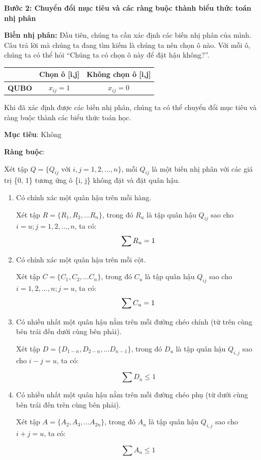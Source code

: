 \textbf{Bước 2: Chuyển đổi mục tiêu và các ràng buộc thành biểu thức toán nhị phân}

\textbf{Biến nhị phân:} Đầu tiên, chúng ta cần xác định các biến nhị phân của mình. Câu trả lời mà chúng ta đang tìm kiếm là chúng ta nên chọn ô nào. Với mỗi ô, chúng ta có thể hỏi “Chúng ta có chọn ô này để đặt hậu không?”. 

\begin{table}[H]
	\centering
	\begin{tabular}{ c c c }
		\hline
		& \textbf{Chọn ô [i,j]} & \textbf{Không chọn ô [i,j]} \\
		\hline
		\textbf{\textbf{QUBO}}     & $x_{ij} = 1$& $x_{ij} =0 $  \\
		
		\hline
	\end{tabular}
	
	
\end{table}

Khi đã xác định được các biến nhị phân, chúng ta có thể chuyển đổi mục tiêu và ràng buộc thành các biểu thức toán học.


\textbf{Mục tiêu}: Không

\textbf{Ràng buộc}:

Xét tập $Q = \{ Q_{ij} \text{ với } i, j = 1,2, \dots , n\}$, mỗi $Q_{ij}$ là một biến nhị phân với các giá trị \{0, 1\} tương ứng ô \{i, j\} không đặt và đặt quân hậu.
\begin{enumerate}
	
	\item Có chính xác một quân hậu trên mỗi hàng. 
	
	Xét tập $R = \{R_1, R_2, \dots R_n\}$, trong đó $R_u$ là tập quân hậu $Q_{ij}$ sao cho $i = u; j = 1,2, \dots , n$, ta có:
	\[
	\sum{R_u} = 1 \\ 
	\]
	
	
	\item Có chính xác một quân hậu trên mỗi cột.
	
	Xét tập $C = \{C_1, C_2, \dots C_n\}$, trong đó $C_u$ là tập quân hậu $Q_{ij}$ sao cho $i = 1,2, \dots , n; j = u$, ta có:
	\[
	\sum{C_u} = 1 \\ 
	\]
	
	\item Có nhiều nhất một quân hậu nằm trên mỗi đường chéo chính (từ trên cùng bên trái đến dưới cùng bên phải).
	
	Xét tập $D = \{D_{1-n}, D_{2-n}, \dots D_{n-1}\}$, trong đó $D_u$ là tập quân hậu $Q_{i,j}$ sao cho $i-j =u$, ta có:
	
	\[
		\sum{D_u}  \leq 1
	\]
	
	\item Có nhiều nhất một quân hậu nằm trên mỗi đường chéo phụ (từ dưới cùng bên trái đến trên cùng bên phải).
	
	Xét tập $A = \{A_2, A_3, \dots A_{2n}\}$, trong đó $A_u$ là tập quân hậu $Q_{i,j}$ sao cho $i+j =u$, ta có:
	
	\[
		\sum{A_u}  \leq 1 
	\]
	
	
	
\end{enumerate}

